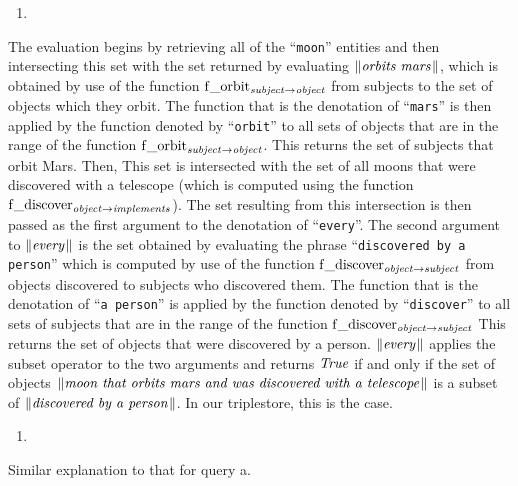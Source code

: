 \documentclass[../main.tex]{subfiles}
\begin{document}
\begin{refsection}
\begin{enumerate}[before=\small, label=\alph*.]
	\setlength\itemsep{0em}
	\item {}
\end{enumerate}
The evaluation begins by retrieving all of the ``\texttt{moon}'' entities and then
intersecting this set with the set returned by evaluating $\lVert\textit{orbits mars\hspace{0.1em}}\rVert$, which is obtained by use of the
function $\operatorname{f\_orbit}_{\operatorname{\mathit{subject}} \rightarrow \operatorname{\mathit{object}}}$ from subjects to the set of objects which they orbit. The function that is the
denotation of ``\texttt{mars}'' is then applied by the function denoted by ``\texttt{orbit}'' to all sets of objects that are in
the range of the function $\operatorname{f\_orbit}_{\operatorname{\mathit{subject}} \rightarrow \operatorname{\mathit{object}}}$. This returns the set of subjects that orbit Mars. Then, This set is
intersected with the set of all moons that were discovered with a telescope (which is computed using
the function $\operatorname{f\_discover}_{\operatorname{\mathit{object}} \rightarrow \operatorname{\mathit{implements}}}$). The set resulting from this intersection is then passed as the first
argument to the denotation of ``\texttt{every}''. The second argument to $\lVert\textit{every\hspace{0.1em}}\rVert$ is the set obtained by
evaluating the phrase ``\texttt{discovered by a person}'' which is computed by use of the function $\operatorname{f\_discover}_{\operatorname{\mathit{object}} \rightarrow \operatorname{\mathit{subject}}}$ from objects discovered to subjects who discovered them. The function that is the denotation of ``\texttt{a
person}'' is applied by the function denoted by ``\texttt{discover}'' to all sets of subjects that are in the range of
the function $\operatorname{f\_discover}_{\operatorname{\mathit{object}} \rightarrow \operatorname{\mathit{subject}}}$ This returns the set of objects that were discovered by a person.
$\lVert\textit{every\hspace{0.1em}}\rVert$ applies the subset operator to the two arguments and returns $\operatorname{\mathit{True}}$ if and only if the set of objects
$\lVert\textit{moon that orbits mars and was discovered with a telescope\hspace{0.1em}}\rVert$ is a subset of $\lVert\textit{discovered by a person\hspace{0.1em}}\rVert$. In
our triplestore, this is the case.
\begin{enumerate}[before=\small, label=\alph*.]
	\setlength\itemsep{0em}
	\setcounter{enumi}{1}
	\item {}
\end{enumerate}
\noindent Similar explanation to that for query a.

\end{refsection}
\end{document}
